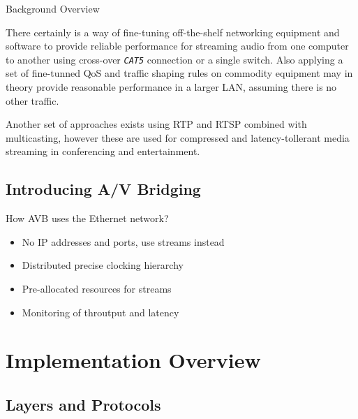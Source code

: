 \documentclass{beamer}
\begin{document}
\begin{frame}[allowframebreaks]{ Background Overview }
\begin{itemize}
\break

There certainly is a way of fine-tuning off-the-shelf networking equipment and software to provide
reliable performance for streaming audio from one computer to another using cross-over \emph{\texttt{CAT5}}
connection or a single switch. Also applying a set of fine-tunned QoS and traffic shaping rules on commodity
equipment may in theory provide reasonable performance in a larger LAN, assuming there is no other traffic.

Another set of approaches exists using RTP and RTSP combined with multicasting, however these
are used for compressed and latency-tollerant media streaming in conferencing and entertainment.


\end{itemize}

\end{frame}


\subsection{Introducing A/V Bridging}

\begin{frame}{ How AVB uses the Ethernet network? }

\begin{itemize}
	\item No IP addresses and ports, use streams instead
	\item Distributed precise clocking hierarchy
	\item Pre-allocated resources for streams
	\item Monitoring of throutput and latency
\end{itemize}

\end{frame}


\section{Implementation Overview}

\subsection{Layers and Protocols}
\end{document}
